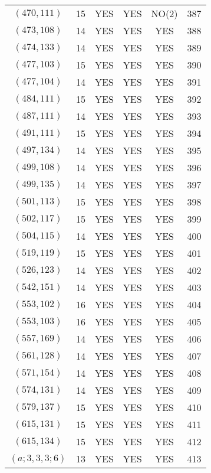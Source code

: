 \begin{longtable}{|c|c|c|c|c|c|}
$(470, 111)$ & 15 & YES & YES & NO(2) & 387\\
$(473, 108)$ & 14 & YES & YES & YES & 388\\
$(474, 133)$ & 14 & YES & YES & YES & 389\\
$(477, 103)$ & 15 & YES & YES & YES & 390\\
$(477, 104)$ & 14 & YES & YES & YES & 391\\
$(484, 111)$ & 15 & YES & YES & YES & 392\\
$(487, 111)$ & 14 & YES & YES & YES & 393\\
$(491, 111)$ & 15 & YES & YES & YES & 394\\
$(497, 134)$ & 14 & YES & YES & YES & 395\\
$(499, 108)$ & 14 & YES & YES & YES & 396\\
$(499, 135)$ & 14 & YES & YES & YES & 397\\
$(501, 113)$ & 15 & YES & YES & YES & 398\\
$(502, 117)$ & 15 & YES & YES & YES & 399\\
$(504, 115)$ & 14 & YES & YES & YES & 400\\
$(519, 119)$ & 15 & YES & YES & YES & 401\\
$(526, 123)$ & 14 & YES & YES & YES & 402\\
$(542, 151)$ & 14 & YES & YES & YES & 403\\
$(553, 102)$ & 16 & YES & YES & YES & 404\\
$(553, 103)$ & 16 & YES & YES & YES & 405\\
$(557, 169)$ & 14 & YES & YES & YES & 406\\
$(561, 128)$ & 14 & YES & YES & YES & 407\\
$(571, 154)$ & 14 & YES & YES & YES & 408\\
$(574, 131)$ & 14 & YES & YES & YES & 409\\
$(579, 137)$ & 15 & YES & YES & YES & 410\\
$(615, 131)$ & 15 & YES & YES & YES & 411\\
$(615, 134)$ & 15 & YES & YES & YES & 412\\
$(a; 3, 3, 3; 6)$ & 13 & YES & YES & YES & 413
\end{longtable}
